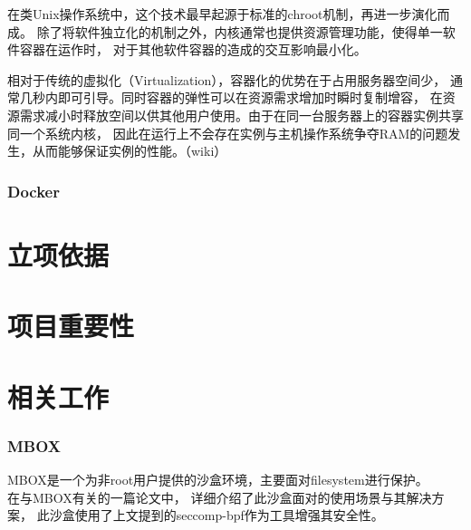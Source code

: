 \documentclass[AutoFakeBold,a4paper]{ctexart}
\begin{document}
在类Unix操作系统中，这个技术最早起源于标准的chroot机制，再进一步演化而成。
除了将软件独立化的机制之外，内核通常也提供资源管理功能，使得单一软件容器在运作时，
对于其他软件容器的造成的交互影响最小化。

相对于传统的虚拟化（Virtualization），容器化的优势在于占用服务器空间少，
通常几秒内即可引导。同时容器的弹性可以在资源需求增加时瞬时复制增容，
在资源需求减小时释放空间以供其他用户使用。由于在同一台服务器上的容器实例共享同一个系统内核，
因此在运行上不会存在实例与主机操作系统争夺RAM的问题发生，从而能够保证实例的性能。（wiki）
\subsubsection{Docker}




\section{立项依据}

\section{项目重要性}

\section{相关工作}



\subsubsection{MBOX}
MBOX是一个为非root用户提供的沙盒环境，主要面对filesystem进行保护。\\

在与MBOX有关的一篇论文\cite{180196}中，
详细介绍了此沙盒面对的使用场景与其解决方案，
此沙盒使用了上文提到的seccomp-bpf作为工具增强其安全性。
\end{document}
